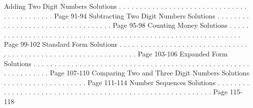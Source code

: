 \documentclass{article}%
\begin{document}
\newline%
Adding Two Digit Numbers Solutions%
.%
.%
.%
.%
.%
.%
.%
.%
.%
.%
.%
.%
.%
.%
.%
.%
.%
.%
.%
.%
.%
.%
.%
.%
.%
.%
.%
.%
.%
.%
.%
.%
.%
.%
.%
.%
.%
.%
.%
.%
.%
.%
.%
Page 91{-}94%
\newline%
Subtracting Two Digit Numbers Solutions%
.%
.%
.%
.%
.%
.%
.%
.%
.%
.%
.%
.%
.%
.%
.%
.%
.%
.%
.%
.%
.%
.%
.%
.%
.%
.%
.%
.%
.%
.%
.%
.%
.%
.%
Page 95{-}98%
\newline%
Counting Money Solutions%
.%
.%
.%
.%
.%
.%
.%
.%
.%
.%
.%
.%
.%
.%
.%
.%
.%
.%
.%
.%
.%
.%
.%
.%
.%
.%
.%
.%
.%
.%
.%
.%
.%
.%
.%
.%
.%
.%
.%
.%
.%
.%
.%
.%
.%
.%
.%
.%
.%
.%
.%
.%
.%
.%
.%
.%
.%
.%
.%
.%
.%
.%
Page 99{-}102%
\newline%
Standard Form Solutions%
.%
.%
.%
.%
.%
.%
.%
.%
.%
.%
.%
.%
.%
.%
.%
.%
.%
.%
.%
.%
.%
.%
.%
.%
.%
.%
.%
.%
.%
.%
.%
.%
.%
.%
.%
.%
.%
.%
.%
.%
.%
.%
.%
.%
.%
.%
.%
.%
.%
.%
.%
.%
.%
.%
.%
.%
.%
.%
.%
.%
.%
.%
.%
Page 103{-}106%
\newline%
Expanded Form Solutions%
.%
.%
.%
.%
.%
.%
.%
.%
.%
.%
.%
.%
.%
.%
.%
.%
.%
.%
.%
.%
.%
.%
.%
.%
.%
.%
.%
.%
.%
.%
.%
.%
.%
.%
.%
.%
.%
.%
.%
.%
.%
.%
.%
.%
.%
.%
.%
.%
.%
.%
.%
.%
.%
.%
.%
.%
.%
.%
.%
.%
.%
.%
.%
Page 107{-}110%
\newline%
Comparing Two and Three Digit Numbers Solutions%
.%
.%
.%
.%
.%
.%
.%
.%
.%
.%
.%
.%
.%
.%
.%
.%
.%
.%
.%
.%
Page 111{-}114%
\newline%
Number Sequences Solutions%
.%
.%
.%
.%
.%
.%
.%
.%
.%
.%
.%
.%
.%
.%
.%
.%
.%
.%
.%
.%
.%
.%
.%
.%
.%
.%
.%
.%
.%
.%
.%
.%
.%
.%
.%
.%
.%
.%
.%
.%
.%
.%
.%
.%
.%
.%
.%
.%
.%
.%
.%
.%
.%
.%
.%
.%
.%
.%
Page 115{-}118%
\newline%
\newpage
\end{document}
